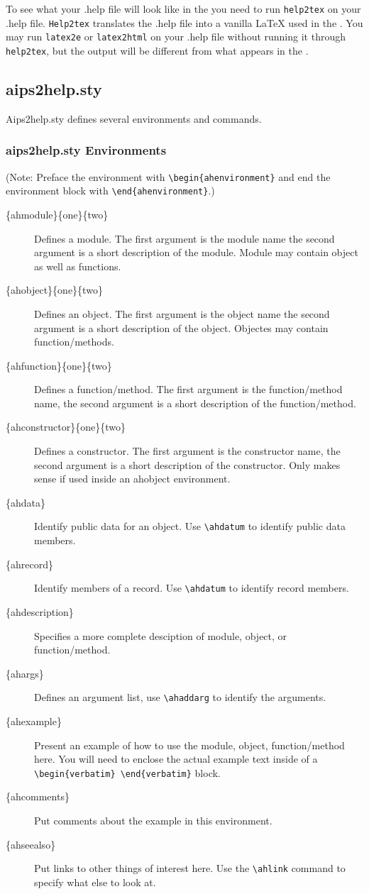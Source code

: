 To see what your .help file will look like in the \userrefman you need to run 
\texttt{help2tex} on your .help file.  \texttt{Help2tex} translates the .help
file into
a vanilla LaTeX used in the \userrefman.
You may run \texttt{latex2e} or \texttt{latex2html} on your .help file
without running it 
through \texttt{help2tex}, but the output will be 
different from what appears in the \userrefman.

\subsection{aips2help.sty\label{197:aips2help}}
Aips2help.sty defines several environments and commands.
\subsubsection{aips2help.sty Environments}
(Note: Preface the environment with
\verb!\begin{ahenvironment}!  and end the environment block with 
\verb!\end{ahenvironment}!.)
\begin{description}
\item[\{ahmodule\}\{one\}\{two\}] Defines a module. The first argument
is the module name the second argument is a short description of the module.
Module may contain object as well as functions.
\item[\{ahobject\}\{one\}\{two\}] Defines an object. The first argument
is the object name the second argument is a short description of the
object.  Objectes may contain function/methods.
\item[\{ahfunction\}\{one\}\{two\}] Defines a function/method. The first
argument is the function/method name, the second argument is a short
description of the function/method.
\item[\{ahconstructor\}\{one\}\{two\}] Defines a constructor.  The first
argument is the constructor name, the second argument is a short description
of the constructor.  Only makes sense if used inside an ahobject environment.
\item[\{ahdata\}]Identify public data for an object. Use \verb!\ahdatum! to
identify public data members.
\item[\{ahrecord\}]Identify members of a record.  Use \verb!\ahdatum! to
identify record members.
\item[\{ahdescription\}] Specifies a more complete desciption of module,
object, or function/method.
\item[\{ahargs\}] Defines an argument list, use \verb!\ahaddarg! to identify the
arguments.
\item[\{ahexample\}] Present an example of how to use the module, object,
function/method here.  You will need to enclose the actual example text
inside of a \verb!\begin{verbatim} \end{verbatim}! block.
\item[\{ahcomments\}] Put comments about the example in this environment.
\item[\{ahseealso\}] Put links to other things of interest here.  Use the
\verb!\ahlink! command to specify what else to look at.
\end{description}

